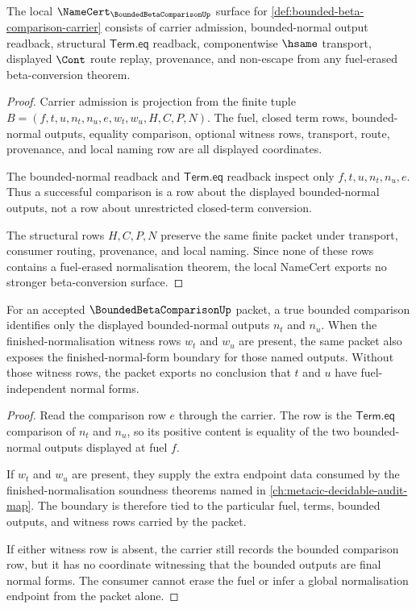 \begin{theorem}
\label{thm:bounded-beta-comparison-namecert-obligations}
The local $\NameCert_{\BoundedBetaComparisonUp}$ surface for
\autoref{def:bounded-beta-comparison-carrier} consists of carrier admission,
bounded-normal output readback, structural $\mathsf{Term.eq}$ readback,
componentwise $\hsame$ transport, displayed $\Cont$ route replay, provenance,
and non-escape from any fuel-erased beta-conversion theorem.
\end{theorem}
\begin{proof}
Carrier admission is projection from the finite tuple
$B=(f,t,u,n_t,n_u,e,w_t,w_u,H,C,P,N)$. The fuel, closed term rows,
bounded-normal outputs, equality comparison, optional witness rows, transport,
route, provenance, and local naming row are all displayed coordinates.

The bounded-normal readback and $\mathsf{Term.eq}$ readback inspect only
$f,t,u,n_t,n_u,e$. Thus a successful comparison is a row about the displayed
bounded-normal outputs, not a row about unrestricted closed-term conversion.

The structural rows $H,C,P,N$ preserve the same finite packet under transport,
consumer routing, provenance, and local naming. Since none of these rows
contains a fuel-erased normalisation theorem, the local NameCert exports no
stronger beta-conversion surface.
\end{proof}

\begin{theorem}
\label{thm:bounded-beta-comparison-finished-soundness-boundary}
For an accepted $\BoundedBetaComparisonUp$ packet, a true bounded comparison
identifies only the displayed bounded-normal outputs $n_t$ and $n_u$. When the
finished-normalisation witness rows $w_t$ and $w_u$ are present, the same
packet also exposes the finished-normal-form boundary for those named outputs.
Without those witness rows, the packet exports no conclusion that $t$ and $u$
have fuel-independent normal forms.
\end{theorem}
\begin{proof}
Read the comparison row $e$ through the carrier. The row is the
$\mathsf{Term.eq}$ comparison of $n_t$ and $n_u$, so its positive content is
equality of the two bounded-normal outputs displayed at fuel $f$.

If $w_t$ and $w_u$ are present, they supply the extra endpoint data consumed by
the finished-normalisation soundness theorems named in
\autoref{ch:metacic-decidable-audit-map}. The boundary is therefore tied to
the particular fuel, terms, bounded outputs, and witness rows carried by the
packet.

If either witness row is absent, the carrier still records the bounded
comparison row, but it has no coordinate witnessing that the bounded outputs
are final normal forms. The consumer cannot erase the fuel or infer a global
normalisation endpoint from the packet alone.
\end{proof}

